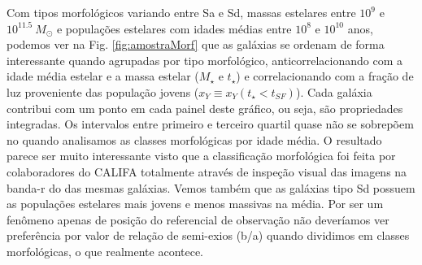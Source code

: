Com tipos morfológicos variando entre Sa e Sd, massas estelares entre $10^9$ e $10^{11.5}\ M_\odot$
e populações estelares com idades médias entre $10^8$ e $10^{10}$ anos, podemos ver na Fig.
\ref{fig:amostraMorf} que as galáxias se ordenam de forma interessante quando agrupadas por tipo
morfológico, anticorrelacionando com a idade média estelar e a massa estelar ($M_\star$ e $t_\star$)
e correlacionando com a fração de luz proveniente das população jovens ($x_Y \equiv x_Y(t_\star <
t_{SF})$). Cada galáxia contribui com um ponto em cada painel deste gráfico, ou seja, são
propriedades integradas. Os intervalos entre primeiro e terceiro quartil quase não se sobrepõem no
quando analisamos as classes morfológicas por idade média. O resultado parece ser muito interessante
visto que a classificação morfológica foi feita por colaboradores do CALIFA totalmente através de
inspeção visual das imagens na banda-r do \SDSS das mesmas galáxias. Vemos também que as galáxias
tipo Sd possuem as populações estelares mais jovens e menos massivas na média. Por ser um fenômeno
apenas de posição do referencial de observação não deveríamos ver preferência por valor de relação
de semi-exios (b/a) quando dividimos em classes morfológicas, o que realmente acontece.

